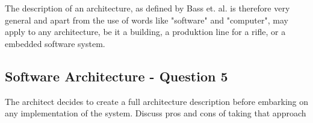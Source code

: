 The description of an architecture, as defined by Bass et. al. is therefore very general and apart from the use of words like "software" and "computer", may apply to any architecture, be it a building, a produktion line for a rifle, or a embedded software system.

\subsection{Software Architecture - Question 5}

\begin{question}
The architect decides to create a full architecture
description before embarking on any implementation of the
system. Discuss pros and cons of taking that approach
\end{question}

